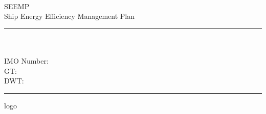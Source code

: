 
\newcommand{\HRule}{\textcolor{greenheavy}{\rule{0.5\linewidth}{0.25mm}}}

\pagestyle{empty}

\begin{titlepage}
~\\
\vspace{4cm}
\begin{center}
\textcolor{greenheavy}{
\Huge{
SEEMP %
}\\
Ship Energy Efficiency Management Plan
}

\vspace{4cm}
\HRule
\textcolor{greenheavy}{
\LARGE{
\\
\\
IMO Number: %
\\
GT: %
\\
DWT: %
\\
}
}
\HRule
\end{center}
\vfill
\noindent
\begin{minipage}{0.4\textwidth}
\begin{flushleft}
\large{
}
\end{flushleft}
\end{minipage}
\begin{minipage}{0.5\textwidth}
\begin{flushright}
\large{
logo
}
\end{flushright}
\end{minipage}
\end{titlepage}
